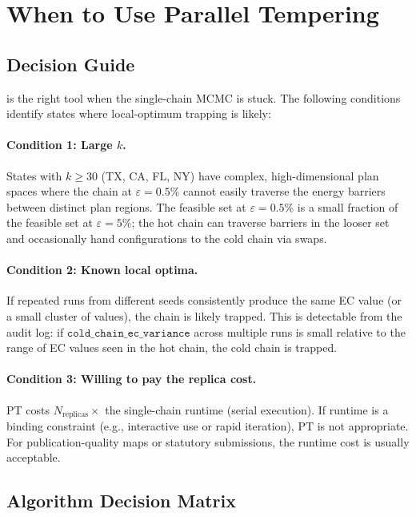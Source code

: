 \section{When to Use Parallel Tempering}
\label{sec:when-to-use}

\subsection{Decision Guide}

\pt{} is the right tool when the single-chain MCMC is stuck.
The following conditions identify states where local-optimum trapping is likely:

\paragraph{Condition 1: Large $k$.}
States with $k \ge 30$ (TX, CA, FL, NY) have complex, high-dimensional plan
spaces where the \fr{} chain at $\varepsilon=0.5\%$ cannot easily traverse the
energy barriers between distinct plan regions.
The feasible set at $\varepsilon=0.5\%$ is a small fraction of the feasible
set at $\varepsilon=5\%$; the hot chain can traverse barriers in the looser
set and occasionally hand configurations to the cold chain via swaps.

\paragraph{Condition 2: Known local optima.}
If repeated runs from different seeds consistently produce the same EC value
(or a small cluster of values), the chain is likely trapped.
This is detectable from the audit log: if $\mathtt{cold\_chain\_ec\_variance}$
across multiple runs is small relative to the range of EC values seen in the
hot chain, the cold chain is trapped.

\paragraph{Condition 3: Willing to pay the replica cost.}
PT costs $N_{\mathrm{replicas}} \times$ the single-chain runtime (serial execution).
If runtime is a binding constraint (e.g., interactive use or rapid iteration),
PT is not appropriate.
For publication-quality maps or statutory submissions, the runtime cost is
usually acceptable.

\subsection{Algorithm Decision Matrix}

